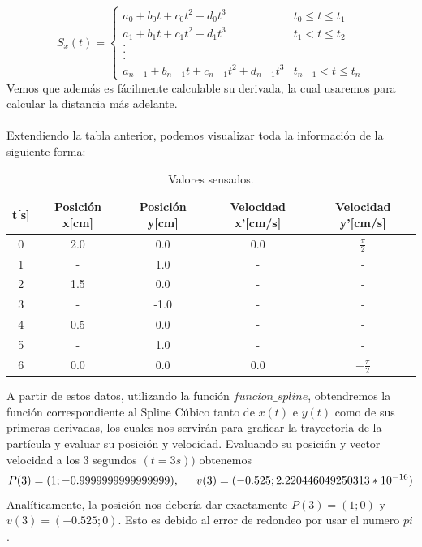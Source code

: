 \documentclass{article}
\begin{document}
    \begin{equation*}
        S_x(t)=
        \begin{cases}
            a_0 + b_0t + c_0t^2 + d_0t^3 & t_0 \leq t \leq t_1 \\
            a_1 + b_1t + c_1t^2 + d_1t^3 & t_1 < t \leq t_2 \\
            .\\
            .\\
            .\\
            a_{n-1} + b_{n-1}t + c_{n-1}t^2 + d_{n-1}t^3 & t_{n-1} < t \leq t_n
        \end{cases}
    \end{equation*}
    \indent Vemos que además es fácilmente calculable su derivada, la cual usaremos para calcular la distancia más adelante.
    \\\\
    \indent Extendiendo la tabla anterior, podemos visualizar toda la información de la siguiente forma:\\
    \begin{table}[h]
        \centering
        \begin{tabular}{|c|c|c|c|c|}
            \hline
            t[s] & Posición x[cm] & Posición y[cm] & Velocidad x'[cm/s] & Velocidad y'[cm/s] \\
            \hline
            0 & 2.0 & 0.0 & 0.0 & \(\frac{\pi}{2}\) \\
            \hline
            1 & - & 1.0 & - & -\\
            \hline
            2 & 1.5 & 0.0 & - & -\\
            \hline
            3 & - & -1.0 & - & -\\
            \hline
            4 & 0.5 & 0.0 & - & -\\
            \hline
            5 & - & 1.0 & - & -\\
            \hline
            6 & 0.0 & 0.0 & 0.0 & \(-\frac{\pi}{2}\) \\
            \hline
        \end{tabular}
        \caption{Valores sensados.}
        \label{Tabla}
    \end{table}

    \indent A partir de estos datos, utilizando la función \(funcion\_spline\), obtendremos la función correspondiente al Spline Cúbico tanto de \(x(t)\) e \(y(t)\) como de sus primeras derivadas, los cuales nos servirán para graficar la trayectoria de la partícula y evaluar su posición y velocidad.
    \indent Evaluando su posición y vector velocidad a los 3 segundos \((t=3 s))\) obtenemos\\
    \begin{equation*}
        P(3) = (1; -0.9999999999999999), \\
        \indent v(3) = (-0.525; 2.220446049250313*10^{-16})
    \end{equation*}
    \indent Analíticamente, la posición nos debería dar exactamente \(P(3)=(1;0)\) y \(v(3)=(-0.525;0)\). Esto es debido al error de redondeo por usar el numero \(pi\).\\\\
    
\end{document}
